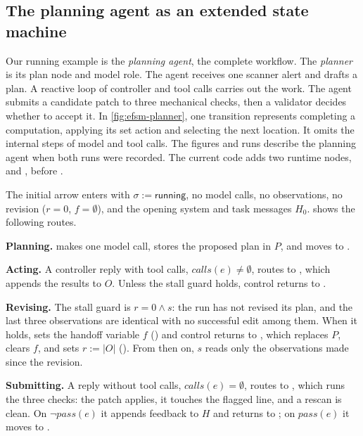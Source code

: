 \subsection{The planning agent as an extended state machine}
\label{sec:efsm-demo}

Our running example is the \emph{planning agent}, the complete workflow. The \emph{planner} is its
plan node and model role. The agent receives one scanner alert and drafts a plan. A
reactive loop of controller and tool calls carries out the work. The agent submits a candidate
patch to three mechanical checks, then a validator decides whether to accept it. In
\cref{fig:efsm-planner}, one transition represents completing a computation, applying its set
action and selecting the next location. It omits the internal steps of model and tool calls. The
figures and runs describe the planning agent when both runs were recorded. The current code adds two
runtime nodes,  and , before .

The initial arrow enters  with $\sigma := \mathsf{running}$, no model calls, no
observations, no revision ($r = 0$, $f = \emptyset$), and the opening system and task messages
$H_0$.  shows the following routes.

\bi

\item \textbf{Planning.}  makes one model call, stores the proposed plan in $P$, and
moves to .

\item \textbf{Acting.} A controller reply with tool calls, $\mathit{calls}(e) \neq \emptyset$, routes
to , which appends the results to $O$. Unless the stall guard holds, control returns
to .

\item \textbf{Revising.} The stall guard is $r = 0 \wedge s$: the run has not revised its plan, and the
last three observations are identical with no successful edit among them. When it holds,
 sets the handoff variable $f$ () and control returns to
, which replaces $P$, clears $f$, and sets $r := |O|$ (). From
then on, $s$ reads only the observations made since the revision.

\item \textbf{Submitting.} A reply without tool calls, $\mathit{calls}(e) = \emptyset$, routes to
, which runs the three checks: the patch applies, it touches the flagged line, and a
rescan is clean. On $\neg\mathit{pass}(e)$ it appends feedback to $H$ and returns to
; on $\mathit{pass}(e)$ it moves to .

